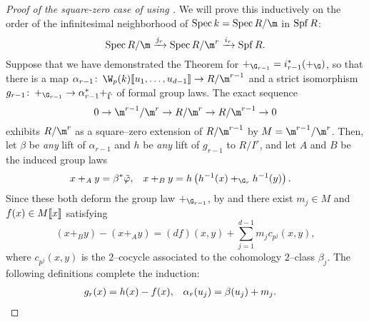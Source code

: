 \begin{proof}[Proof of the square-zero case of  using ]
We will prove this inductively on the order of the infinitesimal neighborhood of $\Spec k = \Spec R / \m$ in $\operatorname{Spf} R$: \[\Spec R / \m \xrightarrow{j_r} \Spec R/\m^r \xrightarrow{i_r} \Spf R.\]  Suppose that we have demonstrated the Theorem for $+_{\G_{r-1}} = i_{r-1}^* (+_{\G})$, so that there is a map $\alpha_{r-1}\co \W_p(k)\ps{u_1, \ldots, u_{d-1}} \to R/\m^{r-1}$ and a strict isomorphism $g_{r-1}\co +_{\G_{r-1}} \to \alpha_{r-1}^* +_{\tilde \Gamma}$ of formal group laws.  The exact sequence \[0 \to \m^{r-1} / \m^r \to R/\m^r \to R/\m^{r-1} \to 0\] exhibits $R/\m^r$ as a square--zero extension of $R/\m^{r-1}$ by $M = \m^{r-1} / \m^r$.  Then, let $\beta$ be \emph{any} lift of $\alpha_{r-1}$ and $h$ be \emph{any} lift of $g_{r-1}$ to $R/I^r$, and let $A$ and $B$ be the induced group laws
\begin{align*}
x +_A y & = \beta^* \tilde \phi, &
x +_B y & = h\left( h^{-1}(x) +_{\G_r} h^{-1}(y) \right).
\end{align*}
Since these both deform the group law $+_{\G_{r-1}}$, by  and  there exist $m_j \in M$ and $f(x) \in M\llbracket{x}\rrbracket$ satisfying \[(x +_B y) - (x +_A y) = (df)(x, y) + \sum_{j=1}^{d-1} m_j c_{p^j}(x, y),\] where $c_{p^j}(x, y)$ is the $2$--cocycle associated to the cohomology $2$--class $\beta_j$.  The following definitions complete the induction:
\begin{align*}
g_r(x) & = h(x) - f(x), &
\alpha_r(u_j) & = \beta(u_j) + m_j. \qedhere
\end{align*}
\end{proof}

